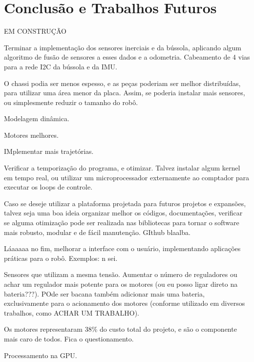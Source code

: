 \section{Conclusão e Trabalhos Futuros}
\label{sec:conclusao}

EM CONSTRUÇÃO


Terminar a implementação dos sensores inerciais e da bússola, aplicando algum algoritmo de fusão de sensores a esses dados e a odometria. Cabeamento de 4 vias para a rede I2C da bússola e da IMU.

O chassi podia ser menos espesso, e as peças poderiam ser melhor distribuídas, para utilizar uma área menor da placa. Assim, se poderia instalar mais sensores, ou simplesmente reduzir o tamanho do robô.

Modelagem dinâmica.

Motores melhores.

IMplementar mais trajetórias.

Verificar a temporização do programa, e otimizar. Talvez instalar algum kernel em tempo real, ou utilizar um microprocessador externamente ao comptador para executar os loops de controle.

Caso se deseje utilizar a plataforma projetada para futuros projetos e expansões, talvez seja uma boa ideia organizar melhor os códigos, documentações, verificar se alguma otimização pode ser realizada nas bibliotecas para tornar o software mais robusto, modular e de fácil manutenção. GIthub blaalba.

Láaaaaa no fim, melhorar a interface com o usuário, implementando aplicações práticas para o robô. Exemplos: n sei.

Sensores que utilizam a mesma tensão. Aumentar o número de reguladores ou achar um regulador mais potente para os motores (ou eu posso ligar direto na bateria???). POde ser bacana também adicionar mais uma bateria, exclusivamente para o acionamento dos motores (conforme utilizado em diversos trabalhos, como ACHAR UM TRABALHO).

Os motores representaram 38\% do custo total do projeto, e são o componente mais caro de todos. Fica o questionamento.

Processamento na GPU.
